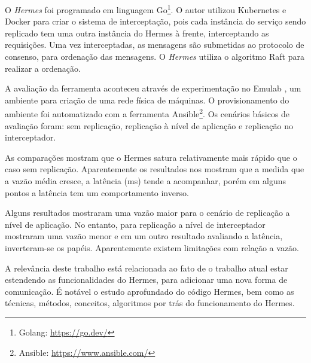 O \textit{Hermes} foi programado em linguagem Go\footnote{Golang: \url{https://go.dev/}}. O autor utilizou Kubernetes e Docker para criar o sistema de interceptação, pois cada instância do serviço sendo replicado tem uma outra instância do Hermes à frente, interceptando as requisições. Uma vez interceptadas, as mensagens são submetidas ao protocolo de consenso, para ordenação das mensagens. O \textit{Hermes} utiliza o algoritmo Raft para realizar a ordenação.

A avaliação da ferramenta aconteceu através de experimentação no Emulab \cite{emulab-10.1145/844128.844152}, um ambiente para criação de uma rede física de máquinas. O provisionamento do ambiente foi automatizado com a ferramenta Ansible\footnote{Ansible: \url{https://www.ansible.com/}}. Os cenários básicos de avaliação foram: sem replicação, replicação à nível de aplicação e replicação no interceptador.

As comparações mostram que o Hermes satura relativamente mais rápido que o caso sem replicação. Aparentemente os resultados nos mostram que a medida que a vazão média cresce, a latência (ms) tende a acompanhar, porém em alguns pontos a latência tem um comportamento inverso.

Alguns resultados mostraram uma vazão maior para o cenário de replicação a nível de aplicação. No entanto, para replicação a nível de interceptador mostraram uma vazão menor e em um outro resultado avaliando a latência, inverteram-se os papéis. Aparentemente existem limitações com relação a vazão.


A relevância deste trabalho está relacionada ao fato de o trabalho atual estar estendendo as funcionalidades do Hermes, para adicionar uma nova forma de comunicação. É notável o estudo aprofundado do código Hermes, bem como as técnicas, métodos, conceitos, algoritmos por trás do funcionamento do Hermes.


